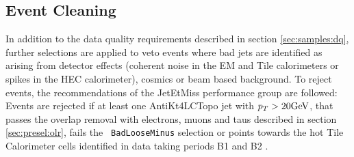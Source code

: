 \subsection{Event Cleaning}
\label{sec:presel:celaning}

In addition to the data quality requirements described in section
\ref{sec:samples:dq}, further selections are applied to veto events
where bad jets are identified as arising from detector effects
(coherent noise in the EM and Tile calorimeters or spikes in the HEC
calorimeter), cosmics or beam based background. To reject events, the
recommendations of the JetEtMiss performance group \cite{TWIKI_JETMET}
are followed: Events are rejected if at least one AntiKt4LCTopo jet
with $p_T>20\text{GeV}$, that passes the overlap removal with electrons,
muons and taus described in section \ref{sec:presel:olr}, fails the {\tt
BadLooseMinus} selection or points towards the hot Tile Calorimeter
cells identified in data taking periods B1 and B2 \cite{hottile}.

